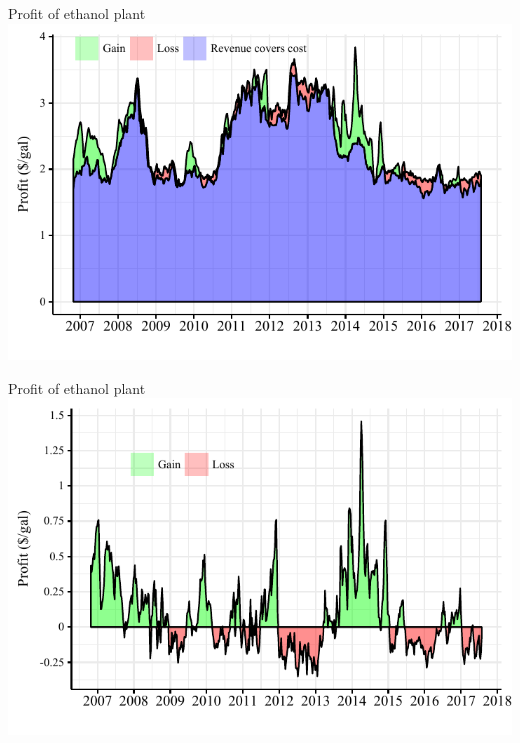 \documentclass[table,xcolor=pdftex,dvipsnames]{beamer}\usepackage[]{graphicx}\usepackage[]{color}
\makeatletter
\def\maxwidth{ %
  \ifdim\Gin@nat@width>\linewidth
    \linewidth
  \else
    \Gin@nat@width
  \fi
}
\newenvironment{knitrout}{}{} %
\makeatother
\begin{document}
\begin{frame}{Profit of ethanol plant}
\begin{knitrout}
\color{fgcolor}
\includegraphics[width=\maxwidth]{figure/figure_pi-1} 

\end{knitrout}
\end{frame}


\begin{frame}{Profit of ethanol plant}
\begin{knitrout}
\color{fgcolor}
\includegraphics[width=\maxwidth]{figure/figure_pi2-1} 

\end{knitrout}
\end{frame}
\end{document}
